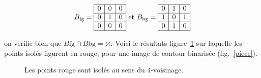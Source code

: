 \documentclass[10pt,a4paper]{article}
\begin{document}
\begin{displaymath}
B_{\text{fg}} = 
\begin{array}{|c|c|c|}
	\hline 0  & 0  & 0   \\
	\hline 0  & 1  & 0  \\
	\hline 0  & 0  & 0  \\
	\hline
\end{array}
\text{ et } 
B_{\text{bg}} = 
	\begin{array}{|c|c|c|}
	 \hline 0  & 1  & 0   \\
	 \hline 1  & 0  & 1  \\
	 \hline 0  & 1  & 0  \\
	\hline
	\end{array}
\end{displaymath}


on verifie bien que $B{\text{fg}}\cap B{\text{bg}} = \varnothing$. Voici le r\'{e}sultats figure~\ref{points} sur laquelle les points isol\'{e}s figurent en rouge, pour une image de contour binaris\'{e}e (fig.~\ref{piece}).
\begin{figure}[h]
\hspace{0.05\textwidth}\scalebox{0.66}{}
\vspace{-25mm}
	\caption{Les points rouge sont isol\'{e}s au sens du 4-voisinage.}
	\label{points}
\end{figure}
\clearpage
\end{document}
